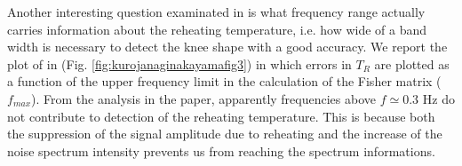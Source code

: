 \documentclass[11pt,a4paper,twoside]{book}
\begin{document}
Another interesting question examinated in \cite{Chap3:ProspectsForDeterminationWithDetectors} is what frequency range actually carries information about the reheating temperature, i.e. how wide of a band  width is necessary to detect the knee shape with a good accuracy. We report the plot of \cite{Chap3:ProspectsForDeterminationWithDetectors} in (Fig. \ref{fig:kurojanaginakayamafig3}) in which errors in $ T_{R} $ are plotted as a function of the upper frequency limit in the calculation of the Fisher matrix ($ f_{max} $). From the analysis in the paper, apparently frequencies above $ f \simeq 0.3$ Hz do not contribute to detection of the reheating temperature. This is because both the suppression of the signal amplitude due to reheating and the increase of the noise spectrum intensity prevents us from reaching the spectrum informations.
\end{document}
